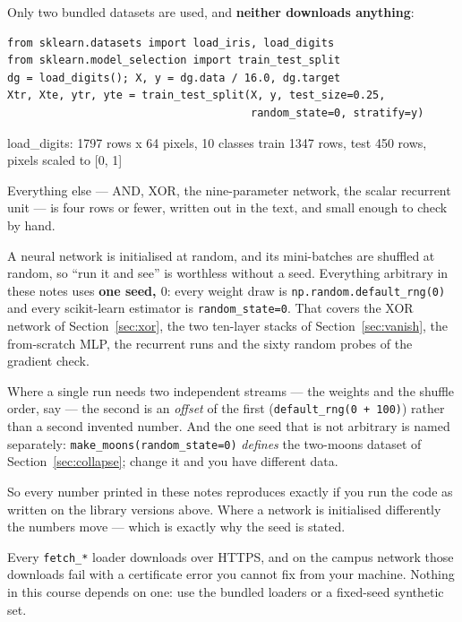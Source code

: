 \documentclass[11pt]{article}
\begin{document}
Only two bundled datasets are used, and \textbf{neither downloads anything}:

\begin{lstlisting}
from sklearn.datasets import load_iris, load_digits
from sklearn.model_selection import train_test_split
dg = load_digits(); X, y = dg.data / 16.0, dg.target
Xtr, Xte, ytr, yte = train_test_split(X, y, test_size=0.25,
                                      random_state=0, stratify=y)
\end{lstlisting}
\begin{codeout}
load_digits: 1797 rows x 64 pixels, 10 classes
train 1347 rows, test 450 rows, pixels scaled to [0, 1]
\end{codeout}

Everything else --- AND, XOR, the nine-parameter network, the scalar recurrent
unit --- is four rows or fewer, written out in the text, and small enough to
check by hand.

\begin{keyidea}
A neural network is initialised at random, and its mini-batches are shuffled
at random, so ``run it and see'' is worthless without a seed. Everything
arbitrary in these notes uses \textbf{one seed, $0$}: every weight draw is
\texttt{np.random.default\_rng(0)} and every scikit-learn estimator is
\texttt{random\_state=0}. That covers the XOR network of
Section~\ref{sec:xor}, the two ten-layer stacks of
Section~\ref{sec:vanish}, the from-scratch MLP, the recurrent runs and the
sixty random probes of the gradient check.

Where a single run needs two independent streams --- the weights and the
shuffle order, say --- the second is an \emph{offset} of the first
(\texttt{default\_rng(0 + 100)}) rather than a second invented number. And the
one seed that is not arbitrary is named separately:
\texttt{make\_moons(random\_state=0)} \emph{defines} the two-moons dataset of
Section~\ref{sec:collapse}; change it and you have different data.

So every number printed in these notes reproduces exactly if you run the code
as written on the library versions above. Where a network is initialised
differently the numbers move --- which is exactly why the seed is stated.
\end{keyidea}

\begin{caution}
Every \texttt{fetch\_*} loader downloads over HTTPS, and on the campus network
those downloads fail with a certificate error you cannot fix from your
machine. Nothing in this course depends on one: use the bundled loaders or a
fixed-seed synthetic set.
\end{caution}
\end{document}
